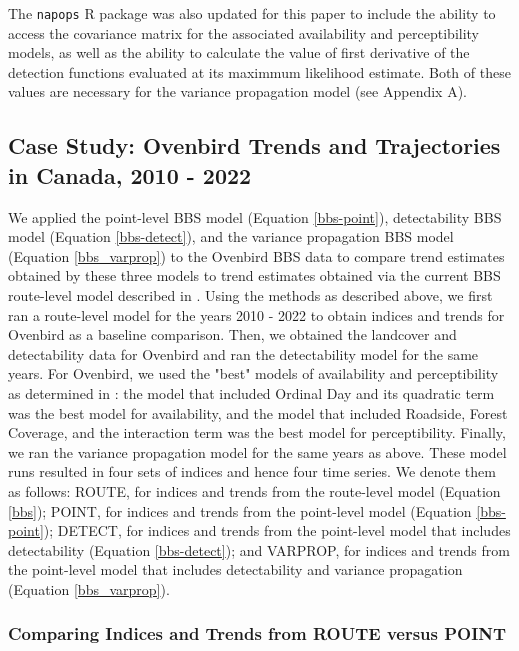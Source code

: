 \documentclass[12pt]{article}
\begin{document}
\par The \texttt{napops} R package was also updated for this paper to include the ability to access the covariance matrix for the associated availability and perceptibility models, as well as the ability to calculate the value of first derivative of the detection functions evaluated at its maximmum likelihood estimate.
Both of these values are necessary for the variance propagation model (see Appendix A).

\subsection{Case Study: Ovenbird Trends and Trajectories in Canada, 2010 - 2022}

\par We applied the point-level BBS model (Equation \ref{bbs-point}), detectability BBS model (Equation \ref{bbs-detect}), and the variance propagation BBS model (Equation \ref{bbs_varprop}) to the Ovenbird BBS data to compare trend estimates obtained by these three models to trend estimates obtained via the current BBS route-level model described in \citet{smith_spatially_2023}.
Using the methods as described above, we first ran a route-level model for the years 2010 - 2022 to obtain indices and trends for Ovenbird as a baseline comparison.
Then, we obtained the landcover and detectability data for Ovenbird and ran the detectability model for the same years.
For Ovenbird, we used the "best" models of availability and perceptibility as determined in \citet{edwards_point_2023}: the model that included Ordinal Day and its quadratic term was the best model for availability, and the model that included Roadside, Forest Coverage, and the interaction term was the best model for perceptibility.
Finally, we ran the variance propagation model for the same years as above.
These model runs resulted in four sets of indices and hence four time series.
We denote them as follows: ROUTE, for indices and trends from the route-level model (Equation \ref{bbs}); POINT, for indices and trends from the point-level model (Equation \ref{bbs-point}); DETECT, for indices and trends from the point-level model that includes detectability (Equation \ref{bbs-detect}); and VARPROP, for indices and trends from the point-level model that includes detectability and variance propagation (Equation \ref{bbs_varprop}).

\subsubsection{Comparing Indices and Trends from ROUTE versus POINT}\label{route-vs-point}
\end{document}
